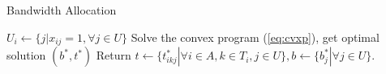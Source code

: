 	\begin{algorithm}[t] 
		\label{algo:bandalloc}
		\small { 
			\caption{Bandwidth Allocation} 
			\begin{algorithmic}[1] 
					\STATE $U_i \gets \{j|x_{ij} = 1, \forall j \in U \}$
					\STATE Solve the convex program (\ref{eq:cvxp}), get optimal solution $(b^*,t^*)$
				\ENDFOR
				\STATE Return $t \gets \{t_{ikj}^*|\forall i \in A, k \in T_i, j \in U \}, b \gets \{b_j^* |\forall j \in U \}$.
			\end{algorithmic} 
		}
	\end{algorithm}

